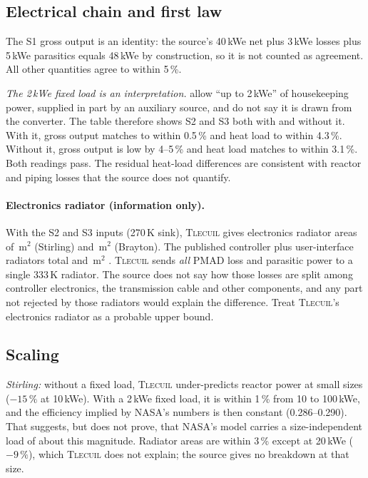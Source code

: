 \documentclass[11pt]{article}
\numberwithin{equation}{section}
\numberwithin{table}{section}
\newcommand{\tlecuil}{\textsc{Tlecuil}}
\begin{document}
\subsection{Electrical chain and first law}
\tablesysbench

The S1 gross output is an identity: the source's 40\,kWe net plus 3\,kWe losses plus
5\,kWe parasitics equals 48\,kWe by construction, so it is not counted as agreement.
All other quantities agree to within 5\,\%.

\emph{The 2\,kWe fixed load is an interpretation.} \textcite{mason2025trades} allow
``up to 2\,kWe'' of housekeeping power, supplied in part by an auxiliary source, and do
not say it is drawn from the converter. The table therefore shows S2 and S3 both with
and without it. With it, gross output matches to within 0.5\,\% and heat load to within
4.3\,\%. Without it, gross output is low by 4--5\,\% and heat load matches to within
3.1\,\%. Both readings pass. The residual heat-load differences are consistent with
reactor and piping losses that the source does not quantify.

\paragraph{Electronics radiator (information only).} With the S2 and S3 inputs (270\,K
sink), \tlecuil{} gives electronics radiator areas of \elecStirling\,m$^2$ (Stirling) and
\elecBrayton\,m$^2$ (Brayton). The published controller plus user-interface radiators
total \elecStirlingPub{} and \elecBraytonPub\,m$^2$ \cite{mason2025trades}. \tlecuil{}
sends \emph{all} PMAD loss and parasitic power to a single 333\,K radiator. The source
does not say how those losses are split among controller electronics, the transmission
cable and other components, and any part not rejected by those radiators would explain
the difference. Treat \tlecuil{}'s electronics radiator as a probable upper bound.

\subsection{Scaling}
\tablescalebench

\emph{Stirling:} without a fixed load, \tlecuil{} under-predicts reactor power at small
sizes ($-15\,\%$ at 10\,kWe). With a 2\,kWe fixed load, it is within 1\,\% from 10 to
100\,kWe, and the efficiency implied by NASA's numbers is then constant (0.286--0.290).
That suggests, but does not prove, that NASA's model carries a size-independent load of
about this magnitude. Radiator areas are within 3\,\% except at 20\,kWe ($-9\,\%$),
which \tlecuil{} does not explain; the source gives no breakdown at that size.
\end{document}
